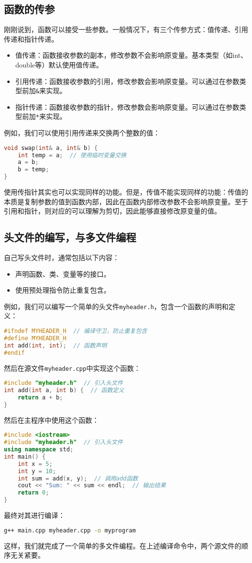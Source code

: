 \subsection{函数的传参}

刚刚说到，函数可以接受一些参数。一般情况下，有三个传参方式：值传递、引用传递和指针传递。
\begin{itemize}
  \item 值传递：函数接收参数的副本，修改参数不会影响原变量。基本类型（如int、double等）默认使用值传递。
  \item 引用传递：函数接收参数的引用，修改参数会影响原变量。可以通过在参数类型前加\texttt{\&}来实现。
  \item 指针传递：函数接收参数的指针，修改参数会影响原变量。可以通过在参数类型前加\texttt{*}来实现。
\end{itemize}
例如，我们可以使用引用传递来交换两个整数的值：
\begin{lstlisting}[language=C++]
void swap(int& a, int& b) {
    int temp = a;  // 使用临时变量交换
    a = b;
    b = temp;
}
\end{lstlisting}
使用传指针其实也可以实现同样的功能。但是，传值不能实现同样的功能：传值的本质是复制参数的值到函数内部，因此在函数内部修改参数不会影响原变量。至于引用和指针，则对应的可以理解为剪切，因此能够直接修改原变量的值。


\subsection{头文件的编写，与多文件编程}

自己写头文件时，通常包括以下内容：
\begin{itemize}
  \item 声明函数、类、变量等的接口。
  \item 使用预处理指令防止重复包含。
\end{itemize}
例如，我们可以编写一个简单的头文件\texttt{myheader.h}，包含一个函数的声明和定义：
\begin{lstlisting}[language=C++]
#ifndef MYHEADER_H  // 编译守卫，防止重复包含
#define MYHEADER_H
int add(int, int);  // 函数声明
#endif
\end{lstlisting}
然后在源文件\texttt{myheader.cpp}中实现这个函数：
\begin{lstlisting}[language=C++]
#include "myheader.h"  // 引入头文件
int add(int a, int b) {  // 函数定义
    return a + b;
}
\end{lstlisting}
然后在主程序中使用这个函数：
\begin{lstlisting}[language=C++]
#include <iostream>
#include "myheader.h"  // 引入头文件
using namespace std;
int main() {
    int x = 5;
    int y = 10;
    int sum = add(x, y);  // 调用add函数
    cout << "Sum: " << sum << endl;  // 输出结果
    return 0;
}
\end{lstlisting}
最终对其进行编译：
\begin{lstlisting}[language=bash]
g++ main.cpp myheader.cpp -o myprogram
\end{lstlisting}
这样，我们就完成了一个简单的多文件编程。在上述编译命令中，两个源文件的顺序无关紧要。

